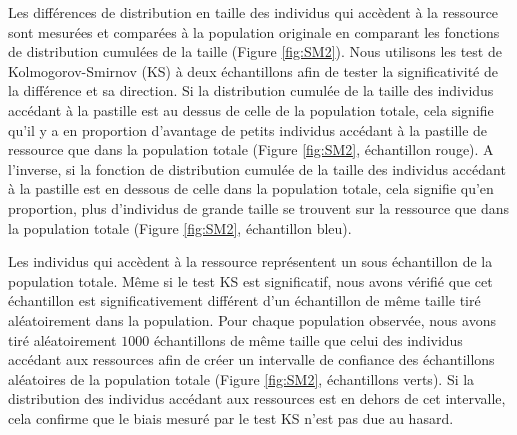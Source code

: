 Les différences de distribution en taille des individus qui accèdent à la
ressource sont mesurées et comparées à la population originale en comparant les
fonctions de distribution cumulées de la taille (Figure \ref{fig:SM2}). Nous
utilisons les test de Kolmogorov-Smirnov (KS) à deux échantillons afin de tester
la significativité de la différence et sa direction. Si la distribution cumulée
de la taille des individus accédant à la pastille est au dessus de celle de la
population totale, cela signifie qu'il y a en proportion d'avantage de petits
individus accédant à la pastille de ressource que dans la population totale
(Figure \ref{fig:SM2}, échantillon rouge). A l'inverse, si la fonction de
distribution cumulée de la taille des individus accédant à la pastille est en
dessous de celle dans la population totale, cela signifie qu'en proportion, plus
d'individus de grande taille se trouvent sur la ressource que dans la population
totale (Figure \ref{fig:SM2}, échantillon bleu).

Les individus qui accèdent à la ressource représentent un sous échantillon de la
population totale. Même si le test KS est significatif, nous avons vérifié que
cet échantillon est significativement différent d'un échantillon de même taille
tiré aléatoirement dans la population. Pour chaque population observée, nous
avons tiré aléatoirement $1000$ échantillons de même taille que celui des
individus accédant aux ressources afin de créer un intervalle de confiance des
échantillons aléatoires de la population totale (Figure \ref{fig:SM2},
échantillons verts). Si la distribution des individus accédant aux ressources
est en dehors de cet intervalle, cela confirme que le biais mesuré par le test KS
n'est pas due au hasard.




